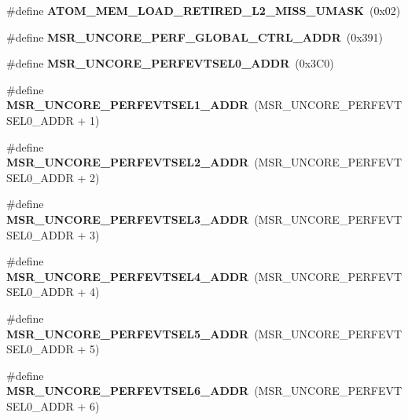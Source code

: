 \begin{DoxyCompactItemize}
\item 
\#define {\bfseries A\+T\+O\+M\+\_\+\+M\+E\+M\+\_\+\+L\+O\+A\+D\+\_\+\+R\+E\+T\+I\+R\+E\+D\+\_\+\+L2\+\_\+\+M\+I\+S\+S\+\_\+\+U\+M\+A\+SK}~(0x02)\label{types_8h_a61f57e34652a6d1477797b48401801da}

\item 
\#define {\bfseries M\+S\+R\+\_\+\+U\+N\+C\+O\+R\+E\+\_\+\+P\+E\+R\+F\+\_\+\+G\+L\+O\+B\+A\+L\+\_\+\+C\+T\+R\+L\+\_\+\+A\+D\+DR}~(0x391)\label{types_8h_af3f19ae0e002a60fd6546e040b0c5159}

\item 
\#define {\bfseries M\+S\+R\+\_\+\+U\+N\+C\+O\+R\+E\+\_\+\+P\+E\+R\+F\+E\+V\+T\+S\+E\+L0\+\_\+\+A\+D\+DR}~(0x3\+C0)\label{types_8h_a7e48eb341897b28179bcaa5b70b3c552}

\item 
\#define {\bfseries M\+S\+R\+\_\+\+U\+N\+C\+O\+R\+E\+\_\+\+P\+E\+R\+F\+E\+V\+T\+S\+E\+L1\+\_\+\+A\+D\+DR}~(M\+S\+R\+\_\+\+U\+N\+C\+O\+R\+E\+\_\+\+P\+E\+R\+F\+E\+V\+T\+S\+E\+L0\+\_\+\+A\+D\+DR + 1)\label{types_8h_aa5b503ab3f1be74c238ee87df2227c32}

\item 
\#define {\bfseries M\+S\+R\+\_\+\+U\+N\+C\+O\+R\+E\+\_\+\+P\+E\+R\+F\+E\+V\+T\+S\+E\+L2\+\_\+\+A\+D\+DR}~(M\+S\+R\+\_\+\+U\+N\+C\+O\+R\+E\+\_\+\+P\+E\+R\+F\+E\+V\+T\+S\+E\+L0\+\_\+\+A\+D\+DR + 2)\label{types_8h_a0e259eb9e97c5a62f776c2d55cd5dede}

\item 
\#define {\bfseries M\+S\+R\+\_\+\+U\+N\+C\+O\+R\+E\+\_\+\+P\+E\+R\+F\+E\+V\+T\+S\+E\+L3\+\_\+\+A\+D\+DR}~(M\+S\+R\+\_\+\+U\+N\+C\+O\+R\+E\+\_\+\+P\+E\+R\+F\+E\+V\+T\+S\+E\+L0\+\_\+\+A\+D\+DR + 3)\label{types_8h_a61a090a6079a203a639a1c7c7310e1bd}

\item 
\#define {\bfseries M\+S\+R\+\_\+\+U\+N\+C\+O\+R\+E\+\_\+\+P\+E\+R\+F\+E\+V\+T\+S\+E\+L4\+\_\+\+A\+D\+DR}~(M\+S\+R\+\_\+\+U\+N\+C\+O\+R\+E\+\_\+\+P\+E\+R\+F\+E\+V\+T\+S\+E\+L0\+\_\+\+A\+D\+DR + 4)\label{types_8h_a010d49776b25ca977779192d242b9967}

\item 
\#define {\bfseries M\+S\+R\+\_\+\+U\+N\+C\+O\+R\+E\+\_\+\+P\+E\+R\+F\+E\+V\+T\+S\+E\+L5\+\_\+\+A\+D\+DR}~(M\+S\+R\+\_\+\+U\+N\+C\+O\+R\+E\+\_\+\+P\+E\+R\+F\+E\+V\+T\+S\+E\+L0\+\_\+\+A\+D\+DR + 5)\label{types_8h_a3f2bdd1896753976342846df2df2b67b}

\item 
\#define {\bfseries M\+S\+R\+\_\+\+U\+N\+C\+O\+R\+E\+\_\+\+P\+E\+R\+F\+E\+V\+T\+S\+E\+L6\+\_\+\+A\+D\+DR}~(M\+S\+R\+\_\+\+U\+N\+C\+O\+R\+E\+\_\+\+P\+E\+R\+F\+E\+V\+T\+S\+E\+L0\+\_\+\+A\+D\+DR + 6)\label{types_8h_ae6571d558e765af67f21ce688a5530e9}


\end{DoxyCompactItemize}
